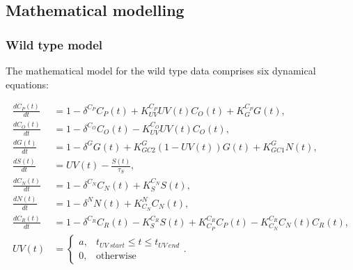 \documentclass[
  10pt,
  onecolumn]{article}
\begin{document}
\hypertarget{mathematical-modelling}{%
\subsection{Mathematical modelling}\label{mathematical-modelling}}

\hypertarget{wild-type-model}{%
\subsubsection{Wild type model}\label{wild-type-model}}

The mathematical model for the wild type data comprises six dynamical
equations:

\begin{align*}
\frac{d C_P(t)}{dt} &= 1 - \delta^{C_P} C_P(t) + K_{UV}^{C_P} UV(t) C_O(t)  + K_{G}^{C_P} G(t) , \\
\frac{dC_O(t)}{dt} &= 1 - \delta^{C_O} C_O(t) - K_{UV}^{C_O} UV(t) C_O(t), \\
\frac{dG(t)}{dt} &= 1 - \delta^{G} G(t) + K_{GC2}^G \left(1 - UV(t)\right) G(t) + K_{GC1}^G N(t) , \\
\frac{dS(t)}{dt} &= UV(t) - \frac{S(t)}{\tau_S}, \\
\frac{dC_N(t)}{dt} &= 1 - \delta^{C_N} C_N(t) + K_{S}^{C_N} S(t), \\
\frac{dN(t)}{dt} &= 1 - \delta^{N} N(t) + K_{C_N}^{N} C_N(t), \\
\frac{dC_R(t)}{dt} &= 1 - \delta^{C_R} C_R(t) - K_{S}^{C_R} S(t) + K_{C_P}^{C_R} C_P(t) - K_{C_N}^{C_R} C_N(t) C_R(t), \\
UV(t) &=
    \begin{cases}
        a, & t_{UV\: start} \leq t \leq t_{UV\: end}\\
        0, & \text{otherwise}
    \end{cases}   .
\end{align*}
\end{document}

